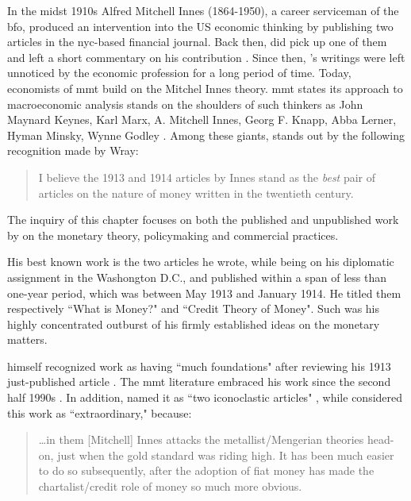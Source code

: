 In the midst 1910s Alfred Mitchell Innes (1864-1950), a career serviceman of the \ac{bfo}, produced an intervention into the US economic thinking by publishing two articles in the \ac{nyc}-based financial journal. Back then, \citeauthor{keynes1914} did pick up one of them and left a short commentary on his contribution \citep{keynes1914}. Since then, \citeauthor{innes1913}'s  writings were left unnoticed by the economic profession for a long period of time. Today, economists of \ac{mmt} build on the Mitchel Innes theory. \ac{mmt} states its approach to macroeconomic analysis stands on the shoulders of such thinkers as John Maynard Keynes, Karl Marx, A. Mitchell Innes, Georg F. Knapp, Abba Lerner, Hyman Minsky, Wynne Godley \citep[p.~1]{wray2015}. Among these giants, \citeauthor{innes1913} stands out by the following recognition made by Wray: 

\begin{quote}
I believe the 1913 and 1914 articles by Innes stand as the \textit{best} pair of articles on the nature of money written in the twentieth century. \citep[p.~223, emphasis added]{wray2004}
\end{quote}

The inquiry of this chapter focuses on both the published and unpublished work by \citeauthor{innes1913} on the monetary theory, policymaking and commercial practices.

His best known work is the two articles he wrote, while being on his diplomatic assignment in the Washongton D.C., and published within a span of less than one-year period, which was between May 1913 and January 1914. He titled them respectively ``What is Money?" and ``Credit Theory of Money". Such was his highly concentrated outburst of his firmly established ideas on the monetary matters. 

\citeauthor{keynes1914} himself recognized \citeauthor{innes1913} work as having ``much foundations" after reviewing his 1913 just-published article \citep{keynes1914}. The \ac{mmt} literature embraced his work since the second half 1990s \citep{wray1998}. In addition, \citeauthor{ingham2004_} named it as ``two iconoclastic articles" \citep[p.~175]{ingham2004_}, while \citeauthor{goodhart2005} considered this work as ``extraordinary," because: 

\begin{quote}
\dots in them [Mitchell] Innes attacks the metallist/Mengerian theories head-on, just when the gold standard was riding high. It has been much easier to do so subsequently, after the adoption of fiat money has made the chartalist/credit role of money so much more obvious. \citep[p.~759]{goodhart2005}
\end{quote}
 
